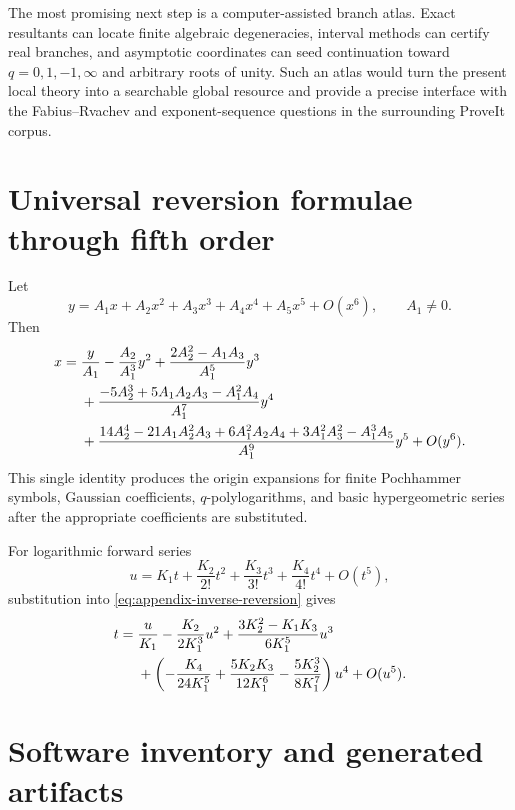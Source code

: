 \documentclass[11pt,a4paper,oneside,openany]{book}
\theoremstyle{definition}
\theoremstyle{remark}
\begin{document}
The most promising next step is a computer-assisted branch atlas.  Exact
resultants can locate finite algebraic degeneracies, interval methods can
certify real branches, and asymptotic coordinates can seed continuation toward
\(q=0,1,-1,\infty\) and arbitrary roots of unity.  Such an atlas would turn
the present local theory into a searchable global resource and provide a
precise interface with the Fabius--Rvachev and exponent-sequence questions in
the surrounding ProveIt corpus.

\appendix

\chapter{Universal reversion formulae through fifth order}

Let
\begin{equation}\label{eq:appendix-forward-reversion}
 y=A_1x+A_2x^2+A_3x^3+A_4x^4+A_5x^5+O(x^6),
 \qquad A_1\ne0.
\end{equation}
Then
\begin{align}
 x={}&\frac{y}{A_1}
 -\frac{A_2}{A_1^3}y^2
 +\frac{2A_2^2-A_1A_3}{A_1^5}y^3 \notag\\
 &+\frac{-5A_2^3+5A_1A_2A_3-A_1^2A_4}{A_1^7}y^4 \notag\\
 &+\frac{14A_2^4-21A_1A_2^2A_3+6A_1^2A_2A_4
 +3A_1^2A_3^2-A_1^3A_5}{A_1^9}y^5
 +O(y^6).
 \label{eq:appendix-inverse-reversion}
\end{align}
This single identity produces the origin expansions for finite Pochhammer
symbols, Gaussian coefficients, \(q\)-polylogarithms, and basic
hypergeometric series after the appropriate coefficients are substituted.

For logarithmic forward series
\begin{equation}\label{eq:appendix-log-forward}
 u=K_1t+\frac{K_2}{2!}t^2+\frac{K_3}{3!}t^3
 +\frac{K_4}{4!}t^4+O(t^5),
\end{equation}
substitution into \eqref{eq:appendix-inverse-reversion} gives
\begin{align}
 t={}&\frac{u}{K_1}-\frac{K_2}{2K_1^3}u^2
 +\frac{3K_2^2-K_1K_3}{6K_1^5}u^3 \notag\\
 &+\left(-\frac{K_4}{24K_1^5}
 +\frac{5K_2K_3}{12K_1^6}
 -\frac{5K_2^3}{8K_1^7}\right)u^4+O(u^5).
 \label{eq:appendix-log-inverse}
\end{align}

\chapter{Software inventory and generated artifacts}
\end{document}
